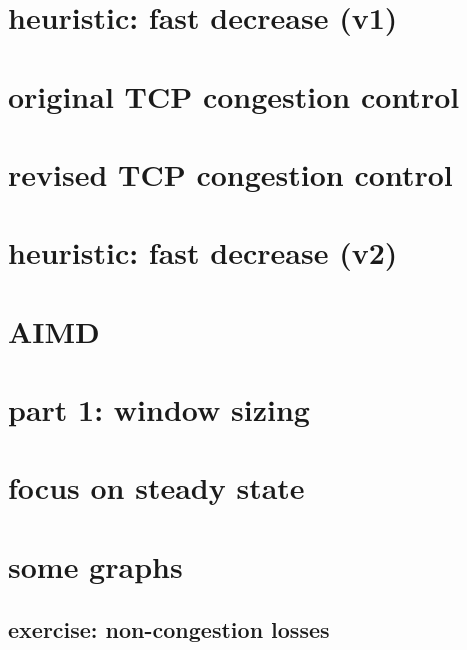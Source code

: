 \section{heuristic: fast decrease (v1)}


\section{original TCP congestion control}


\section{revised TCP congestion control}


\section{heuristic: fast decrease (v2)}


\section{AIMD}


\section{part 1: window sizing}

\section{focus on steady state}


\section{some graphs}



\subsection{exercise: non-congestion losses} %





